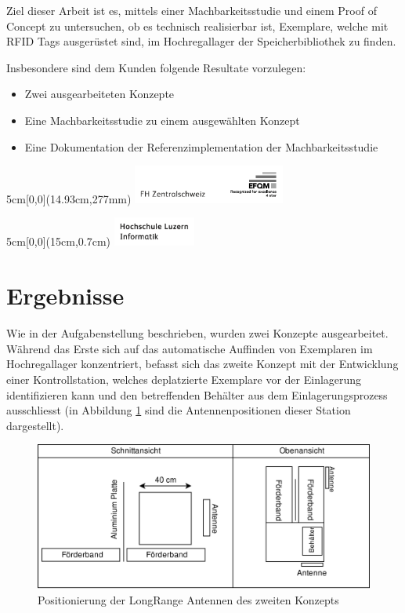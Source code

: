 \documentclass[
	a4paper
]{scrartcl}
\begin{document}
Ziel dieser Arbeit ist es, mittels einer Machbarkeitsstudie und einem Proof of Concept zu untersuchen, ob es technisch realisierbar ist, Exemplare, welche mit RFID Tags ausgerüstet sind, im Hochregallager der Speicherbibliothek zu finden.

Insbesondere sind dem Kunden folgende Resultate vorzulegen:
\begin{itemize}[noitemsep]
	\item Zwei ausgearbeiteten Konzepte
	\item Eine Machbarkeitsstudie zu einem ausgewählten Konzept
	\item Eine Dokumentation der Referenzimplementation der Machbarkeitsstudie
\end{itemize}

\vspace{0.5em}
\noindent
\begin{textblock*}{5cm}[0,0](14.93cm,277mm)
	\includegraphics[keepaspectratio,width=5cm]{img/FHZ_Logo}
\end{textblock*}

\newpage

\begin{textblock*}{5cm}[0,0](15cm,0.7cm)
	\includegraphics[keepaspectratio,width=2.7cm]{img/HSLU_Logo_Header}
\end{textblock*}

\section{Ergebnisse}
Wie in der Aufgabenstellung beschrieben, wurden zwei Konzepte ausgearbeitet. Während das Erste sich auf das automatische Auffinden von Exemplaren im Hochregallager konzentriert, befasst sich das zweite Konzept mit der Entwicklung einer Kontrollstation, welches deplatzierte Exemplare vor der Einlagerung identifizieren kann und den betreffenden Behälter aus dem Einlagerungsprozess ausschliesst (in Abbildung \ref{fig:PosAntennen} sind die Antennenpositionen dieser Station dargestellt).

\begin{figure}[htb]
	\centering
	\includegraphics[keepaspectratio,width=\textwidth]{Positionierung_Antennen}
	\caption{Positionierung der LongRange Antennen des zweiten Konzepts}
	\label{fig:PosAntennen}
\end{figure}
\end{document}
